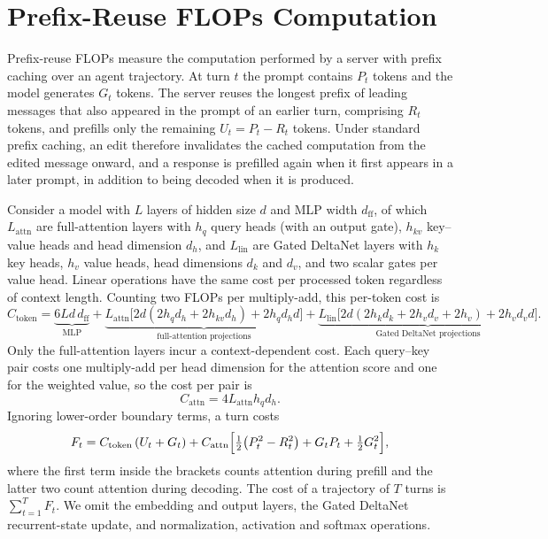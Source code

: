 \section{Prefix-Reuse FLOPs Computation}
\label{app:prefix_reuse_flops}

Prefix-reuse FLOPs measure the computation performed by a server with prefix caching over an agent trajectory. At turn $t$ the prompt contains $P_t$ tokens and the model generates $G_t$ tokens. The server reuses the longest prefix of leading messages that also appeared in the prompt of an earlier turn, comprising $R_t$ tokens, and prefills only the remaining $U_t=P_t-R_t$ tokens. Under standard prefix caching, an edit therefore invalidates the cached computation from the edited message onward, and a response is prefilled again when it first appears in a later prompt, in addition to being decoded when it is produced.

Consider a model with $L$ layers of hidden size $d$ and MLP width $d_{\mathrm{ff}}$, of which $L_{\mathrm{attn}}$ are full-attention layers with $h_q$ query heads (with an output gate), $h_{kv}$ key--value heads and head dimension $d_h$, and $L_{\mathrm{lin}}$ are Gated DeltaNet layers with $h_k$ key heads, $h_v$ value heads, head dimensions $d_k$ and $d_v$, and two scalar gates per value head. Linear operations have the same cost per processed token regardless of context length. Counting two FLOPs per multiply-add, this per-token cost is
\begin{equation}
C_{\mathrm{token}}
=\underbrace{6Ld\,d_{\mathrm{ff}}}_{\text{MLP}}
+\underbrace{L_{\mathrm{attn}}\bigl[2d(2h_qd_h+2h_{kv}d_h)+2h_qd_hd\bigr]}_{\text{full-attention projections}}
+\underbrace{L_{\mathrm{lin}}\bigl[2d(2h_kd_k+2h_vd_v+2h_v)+2h_vd_vd\bigr]}_{\text{Gated DeltaNet projections}}.
\end{equation}
Only the full-attention layers incur a context-dependent cost. Each query--key pair costs one multiply-add per head dimension for the attention score and one for the weighted value, so the cost per pair is
\begin{equation}
C_{\mathrm{attn}}=4L_{\mathrm{attn}}h_qd_h.
\end{equation}
Ignoring lower-order boundary terms, a turn costs
\begin{equation}
F_t
=C_{\mathrm{token}}\,(U_t+G_t)
+C_{\mathrm{attn}}\Bigl[\tfrac12\bigl(P_t^2-R_t^2\bigr)+G_tP_t+\tfrac12G_t^2\Bigr],
\end{equation}
where the first term inside the brackets counts attention during prefill and the latter two count attention during decoding. The cost of a trajectory of $T$ turns is $\sum_{t=1}^{T}F_t$. We omit the embedding and output layers, the Gated DeltaNet recurrent-state update, and normalization, activation and softmax operations.

